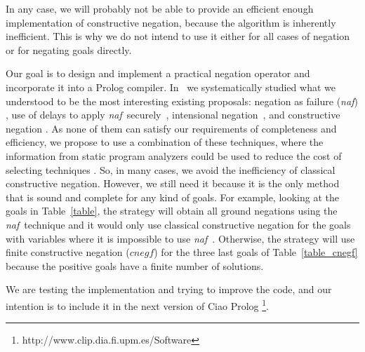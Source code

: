 \documentclass{llncs}
\newcommand{\naf}{{\em naf}}\newcommand{\viejo}[1]{}
\begin{document}
In any case, we will probably not be able to provide an efficient enough
implementation of constructive negation, because the algorithm is
inherently inefficient.  This is why we do not intend to
use it either for all cases of negation or for negating goals
directly.

Our goal is to design and implement a practical negation operator and
incorporate it into a Prolog compiler.
In~\cite{SusanaPADL2000,SusanaLPAR01} we systematically studied what
we understood to be the most interesting existing proposals: negation
as failure (\naf) \cite{Clark}, use of delays to apply \naf\
securely~\cite{naish:lncs}, intensional
negation~\cite{Barbuti1,Barbuti2}, and constructive negation
\cite{Chan1,Chan2,Drabent,Stuckey,Stuckey95}. As none of them can
satisfy our requirements of completeness and efficiency, we propose to
use a combination of these techniques, where the information from
static program analyzers could be used to reduce the cost of selecting
techniques \cite{SusanaLPAR01}. So, in many cases, we avoid the
inefficiency of classical constructive negation. However, we still
need it because it is the only method that is sound and complete for
any kind of goals. For example, looking at the goals in
Table~\ref{table}, the strategy will obtain all ground negations using
the \naf\ technique and it would only use classical constructive
negation for the goals with variables where it is impossible to use
\naf\ . Otherwise, the strategy will use finite constructive negation
($cnegf$) for the three last goals of Table~\ref{table_cnegf} because
the positive goals have a finite number of solutions.

We are testing the implementation and trying to improve the code, and
our intention is to include it in the next version of Ciao Prolog
\footnote{http://www.clip.dia.fi.upm.es/Software}.
  


 \begin{small}

     
    

 \end{small}


\end{document}
